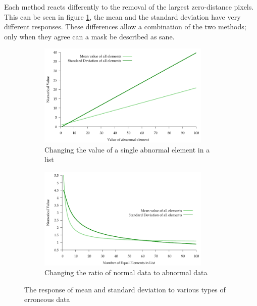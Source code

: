 \documentclass[../main.tex]{subfiles}
\begin{document}
    Each method reacts differently to the removal of the largest zero-distance pixels.
    This can be seen in figure \ref{stddev_image}, the mean and the standard deviation have very different responses.
    These differences allow a combination of the two methods; only when they agree can a mask be described as sane. 
      \begin{figure}[H]
        \centering
        \begin{subfigure}[B]{0.8\textwidth}
          \centering
          \includegraphics[width=0.9\textwidth]{graphs/stddev_great_abnormal}
          \caption{Changing the value of a single abnormal element in a list}
        \end{subfigure}

        \begin{subfigure}[B]{0.8\textwidth}
          \centering
          \includegraphics[width=0.9\textwidth]{graphs/stddev_great_range}
          \caption{Changing the ratio of normal data to abnormal data}
        \end{subfigure}
        \caption{The response of mean and standard deviation to various types of erroneous data}
        \label{stddev_image}
      \end{figure}
    
\end{document}

